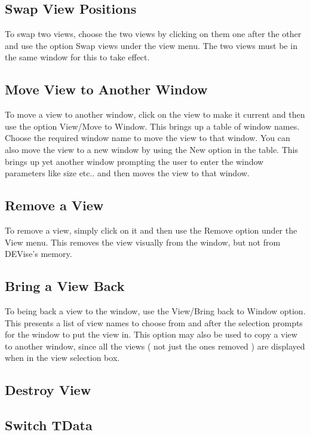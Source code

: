 \subsection{Swap View Positions}

To swap two views, choose the two views by clicking on them one after the other and use the option Swap views under the view menu. The two views must be in the same window for this to take effect.

\subsection{Move View to Another Window}

To move a view to another window, click on the view to make it current and then use the option View/Move to Window. This brings up a table of window names. Choose the required window name to move the view to that window. You can also move the view to a new window by using the New option in the table. This brings up yet another window prompting the user to enter the window parameters like size etc.. and then moves the view to that window.

\subsection{Remove a View}

To remove a view, simply click on it and then use the Remove option under the View menu. This removes the view visually from the window, but not from DEVise's memory. 

\subsection{Bring a View Back}

To being back a view to the window, use the View/Bring back to Window option. This presents a list of view names to choose from and after the selection prompts for the window to put the view in. This option may also be used to copy a view to another window, since all the views ( not just the ones removed ) are displayed when in the view selection box.

\subsection{Destroy View}


\subsection{Switch TData}

